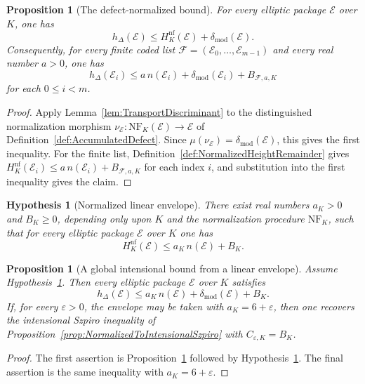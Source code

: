 \documentclass[10pt, reqno]{amsart}
\theoremstyle{plain}
\newtheorem{proposition}[theorem]{Proposition}
\theoremstyle{definition}
\theoremstyle{plain}
\newtheorem{hypothesis}[theorem]{Hypothesis}
\newcommand{\defect}{\delta_{\mathrm{mod}}}
\begin{document}
\begin{proposition}[The defect-normalized bound]
\label{prop:DefectNormalizedBound}
For every elliptic package $\mathcal{E}$ over $K$, one has
\[
  h_{\Delta}(\mathcal{E})
  \le
  H^{\mathrm{nf}}_{K}(\mathcal{E})+
  \defect(\mathcal{E}).
\]
Consequently, for every finite coded list $\mathcal{F}=(\mathcal{E}_{0},\ldots,\mathcal{E}_{m-1})$ and every real number $a>0$, one has
\[
  h_{\Delta}(\mathcal{E}_{i})
  \le
  a\,n(\mathcal{E}_{i})+
  \defect(\mathcal{E}_{i})+
  B_{\mathcal{F},a,K}
\]
for each $0\le i<m$.
\end{proposition}

\begin{proof}
Apply Lemma~\ref{lem:TransportDiscriminant} to the distinguished normalization morphism $\nu_{\mathcal{E}}\colon\mathrm{NF}_{K}(\mathcal{E})\to\mathcal{E}$ of Definition~\ref{def:AccumulatedDefect}. Since $\mu(\nu_{\mathcal{E}})=\defect(\mathcal{E})$, this gives the first inequality. For the finite list, Definition~\ref{def:NormalizedHeightRemainder} gives $H^{\mathrm{nf}}_{K}(\mathcal{E}_{i})\le a\,n(\mathcal{E}_{i})+B_{\mathcal{F},a,K}$ for each index $i$, and substitution into the first inequality gives the claim.
\end{proof}

\begin{hypothesis}[Normalized linear envelope]
\label{hyp:NormalizedLinearEnvelope}
There exist real numbers $a_{K}>0$ and $B_{K}\ge 0$, depending only upon $K$ and the normalization procedure $\mathrm{NF}_{K}$, such that for every elliptic package $\mathcal{E}$ over $K$ one has
\[
  H^{\mathrm{nf}}_{K}(\mathcal{E})
  \le
  a_{K}\,n(\mathcal{E})+B_{K}.
\]
\end{hypothesis}

\begin{proposition}[A global intensional bound from a linear envelope]
\label{prop:LinearEnvelopeGivesIntensionalBound}
Assume Hypothesis~\ref{hyp:NormalizedLinearEnvelope}. Then every elliptic package $\mathcal{E}$ over $K$ satisfies
\[
  h_{\Delta}(\mathcal{E})
  \le
  a_{K}\,n(\mathcal{E})+
  \defect(\mathcal{E})+B_{K}.
\]
If, for every $\varepsilon>0$, the envelope may be taken with $a_{K}=6+\varepsilon$, then one recovers the intensional Szpiro inequality of Proposition~\ref{prop:NormalizedToIntensionalSzpiro} with $C_{\varepsilon,K}=B_{K}$.
\end{proposition}

\begin{proof}
The first assertion is Proposition~\ref{prop:DefectNormalizedBound} followed by Hypothesis~\ref{hyp:NormalizedLinearEnvelope}. The final assertion is the same inequality with $a_{K}=6+\varepsilon$.
\end{proof}
\end{document}
